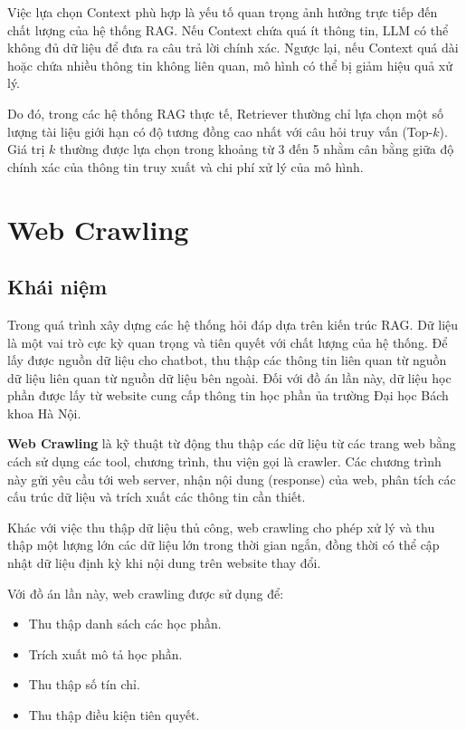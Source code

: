 \documentclass[../DoAn.tex]{subfiles}
\begin{document}
Việc lựa chọn Context phù hợp là yếu tố quan trọng ảnh hưởng trực tiếp đến chất lượng của hệ thống RAG. Nếu Context chứa quá ít thông tin, LLM có thể không đủ dữ liệu để đưa ra câu trả lời chính xác. Ngược lại, nếu Context quá dài hoặc chứa nhiều thông tin không liên quan, mô hình có thể bị giảm hiệu quả xử lý.

Do đó, trong các hệ thống RAG thực tế, Retriever thường chỉ lựa chọn một số lượng tài liệu giới hạn có độ tương đồng cao nhất với câu hỏi truy vấn (Top-$k$). Giá trị $k$ thường được lựa chọn trong khoảng từ 3 đến 5 nhằm cân bằng giữa độ chính xác của thông tin truy xuất và chi phí xử lý của mô hình.

\section{Web Crawling}
\subsection{Khái niệm}
Trong quá trình xây dựng các hệ thống hỏi đáp dựa trên kiến trúc RAG. Dữ liệu là một vai trò cực kỳ quan trọng và tiên quyết với chất lượng của hệ thống. Để lấy được nguồn dữ liệu cho chatbot, thu thập các thông tin liên quan từ nguồn dữ liệu liên quan từ nguồn dữ liệu bên ngoài. Đối với đồ án lần này, dữ liệu học phần được lấy từ website cung cấp thông tin học phần ủa trường Đại học Bách khoa Hà Nội.

\textbf{Web Crawling} là kỹ thuật từ động thu thập các dữ liệu từ các trang web bằng cách sử dụng các tool, chương trình, thu viện gọi là crawler. Các chương trình này gửi yêu cầu tới web server, nhận nội dung (response) của web, phân tích các cấu trúc dữ liệu và trích xuất các thông tin cần thiết.

Khác với việc thu thập dữ liệu thủ công, web crawling cho phép xử lý và thu thập một lượng lớn các dữ liệu lớn trong thời gian ngắn, đồng thời có thể cập nhật dữ liệu định kỳ khi nội dung trên website thay đổi.

Với đồ án lần này, web crawling được sử dụng để:
\begin{itemize}
    \item Thu thập danh sách các học phần.
    \item Trích xuất mô tả học phần.
    \item Thu thập số tín chỉ.
    \item Thu thập điều kiện tiên quyết.
\end{itemize}
\vspace{2mm}
\end{document}
